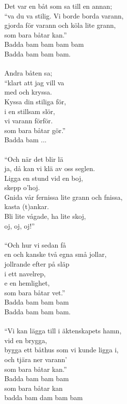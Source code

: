 \vspace{10pt}
Det var en båt som sa till en annan;\\
``va du va stilig. Vi borde borda varann,\\
gjorda för varann och köla lite grann,\\
som bara båtar kan.''\\
Badda bam bam bam bam\\
Badda bam bam bam.\\
\\
Andra båten sa;\\
``klart att jag vill va\\
med och kryssa.\\
Kyssa din stiliga för,\\
i en stillsam slör,\\
vi varann förför.\\
som bara båtar gör.''\\
Badda bam ...\\
\\
``Och när det blir lä\\
ja, då kan vi klä av oss seglen.\\
Ligga en stund vid en boj,\\
skepp o'hoj.\\
Gnida vår fernissa lite grann och fnissa,\\
kasta (t)ankar.\\
Bli lite vågade, ha lite skoj,\\
oj, oj, oj!''\\
\\
``Och hur vi sedan få\\
en och kanske två egna små jollar,\\
jollrande efter på släp\\
i ett navelrep,\\
e en hemlighet,\\
som bara båtar vet.''\\
Badda bam bam bam\\
Badda bam bam bam.\\
\\
``Vi kan lägga till i äktenskapets hamn,\\
vid en brygga,\\
bygga ett båthus som vi kunde ligga i,\\
och tjära ner varann'\\
som bara båtar kan.''\\
Badda bam bam bam\\
som bara båtar kan\\
badda bam dam bam bam
